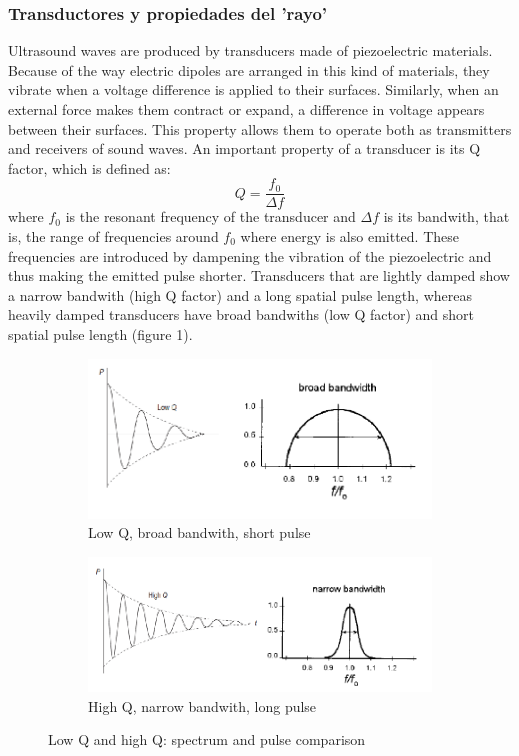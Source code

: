 \documentclass[11pt]{article} %
\begin{document}
\subsubsection{Transductores y propiedades del 'rayo'}


	Ultrasound waves are produced by transducers made of piezoelectric materials. Because of the way electric dipoles are arranged in this kind of materials, they vibrate when a voltage difference is applied to their surfaces. Similarly, when an external force makes them contract or expand, a difference in voltage appears between their surfaces. This property allows them to operate both as transmitters and receivers of sound waves. An important property of a transducer is its Q factor, which is defined as: \[ Q = \frac{f_0}{\Delta f} \] where $f_0$ is the resonant frequency of the transducer and $ \Delta f$ is its bandwith, that is, the range of frequencies around $f_0$ where energy is also emitted. These frequencies are introduced by dampening the vibration of the piezoelectric and thus making the emitted pulse shorter. Transducers that are lightly damped show a  narrow bandwith (high Q factor) and a long spatial pulse length, whereas heavily damped transducers have broad bandwiths (low Q factor) and short spatial pulse length (figure 1). 

	\begin{figure}
	\centering
		\begin{subfigure}{0.6\textwidth}
		\centering
		\includegraphics[width=\textwidth]{figuras/lowq.png}
		\caption{Low Q, broad bandwith, short pulse}
		\end{subfigure}
		\centering
		\begin{subfigure}{0.6\textwidth}
		\centering
		\includegraphics[width=\textwidth]{figuras/highq.png}
		\caption{High Q, narrow bandwith, long pulse}
		\end{subfigure}	
	\caption{Low Q and high Q: spectrum and pulse comparison\cite{bushberg}\cite{farr}}	
	\end{figure}
\end{document}
